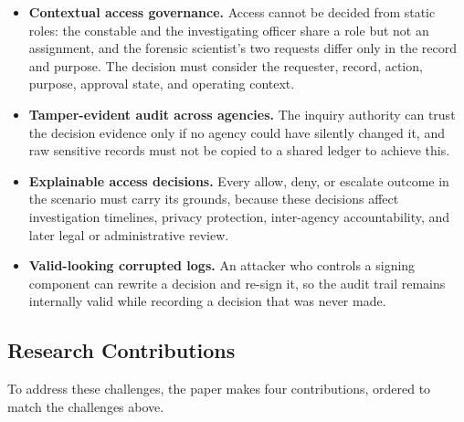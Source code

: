 \begin{itemize}
    \item \textbf{Contextual access governance.} Access cannot be decided
    from static roles: the constable and the investigating officer share a
    role but not an assignment, and the forensic scientist's two requests
    differ only in the record and purpose. The decision must consider the
    requester, record, action, purpose, approval state, and operating
    context.

    \item \textbf{Tamper-evident audit across agencies.} The inquiry
    authority can trust the decision evidence only if no agency could have
    silently changed it, and raw sensitive records must not be copied to a
    shared ledger to achieve this.

    \item \textbf{Explainable access decisions.} Every allow, deny, or
    escalate outcome in the scenario must carry its grounds, because these
    decisions affect investigation timelines, privacy protection,
    inter-agency accountability, and later legal or administrative review.

    \item \textbf{Valid-looking corrupted logs.} An attacker who controls a
    signing component can rewrite a decision and re-sign it, so the audit
    trail remains internally valid while recording a decision that was never
    made.
\end{itemize}

\subsection{Research Contributions}

To address these challenges, the paper makes four contributions, ordered to
match the challenges above.

